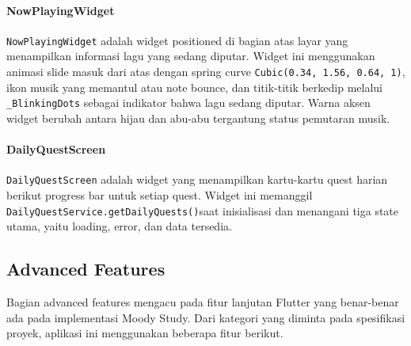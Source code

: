 \documentclass[11pt]{article}
\begin{document}
\paragraph{NowPlayingWidget}

\texttt{NowPlayingWidget} adalah widget positioned di bagian atas layar yang menampilkan informasi lagu yang sedang diputar. Widget ini menggunakan animasi slide masuk dari atas dengan spring curve \texttt{Cubic(0.34, 1.56, 0.64, 1)}, ikon musik yang memantul atau note bounce, dan titik-titik berkedip melalui \texttt{\_BlinkingDots} sebagai indikator bahwa lagu sedang diputar. Warna aksen widget berubah antara hijau dan abu-abu tergantung status pemutaran musik.

\paragraph{DailyQuestScreen}

\texttt{DailyQuestScreen} adalah widget yang menampilkan kartu-kartu quest harian berikut progress bar untuk setiap quest. Widget ini memanggil \texttt{DailyQuestService.getDailyQuests()}\linebreak[1] saat inisialisasi dan menangani tiga state utama, yaitu loading, error, dan data tersedia.

\subsection{Advanced Features}

Bagian advanced features mengacu pada fitur lanjutan Flutter yang benar-benar ada pada implementasi Moody Study. Dari kategori yang diminta pada spesifikasi proyek, aplikasi ini menggunakan beberapa fitur berikut.

\begin{center}
\renewcommand{\arraystretch}{1.2}
\end{center}
\end{document}
